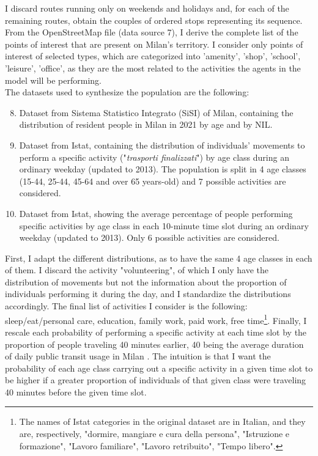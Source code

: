 I discard routes running only on weekends and holidays and, for each of the remaining routes, obtain the couples of ordered stops representing its sequence. From the OpenStreetMap file (data source 7), I derive the complete list of the points of interest that are present on Milan's territory. I consider only points of interest of selected types, which are categorized into 'amenity', 'shop', 'school', 'leisure', 'office', as they are the most related to the activities the agents in the model will be performing. \\
The datasets used to synthesize the population are the following:
\begin{enumerate}
\setcounter{enumi}{7}
    \item Dataset \cite{site18} from Sistema Statistico Integrato (SiSI) of Milan, containing the distribution of resident people in Milan in 2021 by age and by NIL.
    \item Dataset \cite{site10} from Istat, containing the distribution of individuals' movements to perform a specific activity ("\textit{trasporti finalizzati}") by age class during an ordinary weekday (updated to 2013). The population is split in 4 age classes (15-44, 25-44, 45-64 and over 65 years-old) and 7 possible activities are considered.
    \item Dataset \cite{site11} from Istat, showing the average percentage of people performing specific activities by age class in each 10-minute time slot during an ordinary weekday (updated to 2013). Only 6 possible activities are considered.
\end{enumerate}
First, I adapt the different distributions, as to have the same 4 age classes in each of them. I discard the activity "volunteering", of which I only have the distribution of movements but not the information about the proportion of individuals performing it during the day, and I standardize the distributions accordingly. The final list of activities I consider is the following: sleep/eat/personal care, education, family work, paid work, free time\footnote{The names of Istat categories in the original dataset are in Italian, and they are, respectively, "dormire, mangiare e cura della persona", "Istruzione e formazione", "Lavoro familiare", "Lavoro retribuito", "Tempo libero".}. Finally, I rescale each probability of performing a specific activity at each time slot by the proportion of people traveling 40 minutes earlier, 40 being the average duration of daily public transit usage in Milan \cite{bib2}. The intuition is that I want the probability of each age class carrying out a specific activity in a given time slot to be higher if a greater proportion of individuals of that given class were traveling 40 minutes before the given time slot.

